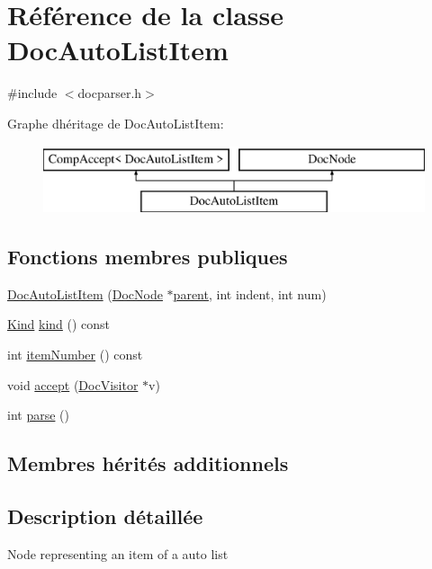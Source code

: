 \hypertarget{class_doc_auto_list_item}{}\section{Référence de la classe Doc\+Auto\+List\+Item}
\label{class_doc_auto_list_item}


{\ttfamily \#include $<$docparser.\+h$>$}

Graphe d\textquotesingle{}héritage de Doc\+Auto\+List\+Item\+:\begin{figure}[H]
\begin{center}
\leavevmode
\includegraphics[height=2.000000cm]{class_doc_auto_list_item}
\end{center}
\end{figure}
\subsection*{Fonctions membres publiques}
\begin{DoxyCompactItemize}
\item 
\hyperlink{class_doc_auto_list_item_a2b29a9aa6b46c4c2c95f361bd3e14112}{Doc\+Auto\+List\+Item} (\hyperlink{class_doc_node}{Doc\+Node} $\ast$\hyperlink{class_doc_node_a990d8b983962776a647e6231d38bd329}{parent}, int indent, int num)
\item 
\hyperlink{class_doc_node_aebd16e89ca590d84cbd40543ea5faadb}{Kind} \hyperlink{class_doc_auto_list_item_aeb2aa1d89092c13e93dedb21ac3854fe}{kind} () const 
\item 
int \hyperlink{class_doc_auto_list_item_abb9509ef81850f8cd74479a1454c3dc9}{item\+Number} () const 
\item 
void \hyperlink{class_doc_auto_list_item_ad3efa9a8be51c6f39682425a139f1025}{accept} (\hyperlink{class_doc_visitor}{Doc\+Visitor} $\ast$v)
\item 
int \hyperlink{class_doc_auto_list_item_abb513e12cef0ab6a17ac78a795d4cedb}{parse} ()
\end{DoxyCompactItemize}
\subsection*{Membres hérités additionnels}


\subsection{Description détaillée}
Node representing an item of a auto list 

